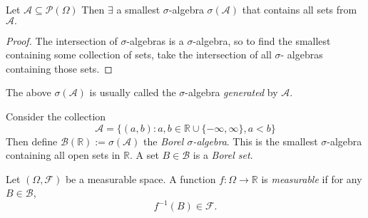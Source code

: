 \begin{lemma}
    Let $\mathcal{A}\subseteq\mathcal{P}(\Omega)$ Then $\exists$ a smallest $\sigma$-algebra 
    $\sigma(\mathcal{A})$ that contains all sets from $\mathcal{A}.$
\end{lemma}
\begin{proof}
    The intersection of $\sigma$-algebras is a $\sigma$-algebra, so to find the 
    smallest containing some collection of sets, take the intersection of all $\sigma$-
    algebras containing those sets.
\end{proof}

\begin{remark}
    The above $\sigma(\mathcal{A})$ is usually called the $\sigma$-algebra
    \emph{generated} by $\mathcal{A}$.
\end{remark}

\begin{definition}
    Consider the collection 
    \begin{equation*}
        \mathcal{A}=\{(a,b):a,b\in\mathbb{R}\cup\{-\infty,\infty\},a<b\}
    \end{equation*}
    Then define $\mathcal{B}(\mathbb{R}):=\sigma(\mathcal{A})$ the \emph{Borel 
    $\sigma$-algebra}. This is the smallest $\sigma$-algebra containing all open
    sets in $\mathbb{R}$. A set $B\in\mathcal{B}$ is a \emph{Borel set}.
\end{definition}

\begin{definition}
    Let $(\Omega,\mathcal{F})$ be a measurable space. A function $f:\Omega\rightarrow\mathbb{R}$
    is \emph{measurable} if for any $B\in\mathcal{B}$,
    \begin{equation*}
        f^{-1}(B)\in\mathcal{F}.
    \end{equation*}
\end{definition}

\begin{definition}
    
\end{definition}

\begin{definition}

\end{definition}

\begin{lemma}
    
\end{lemma}

